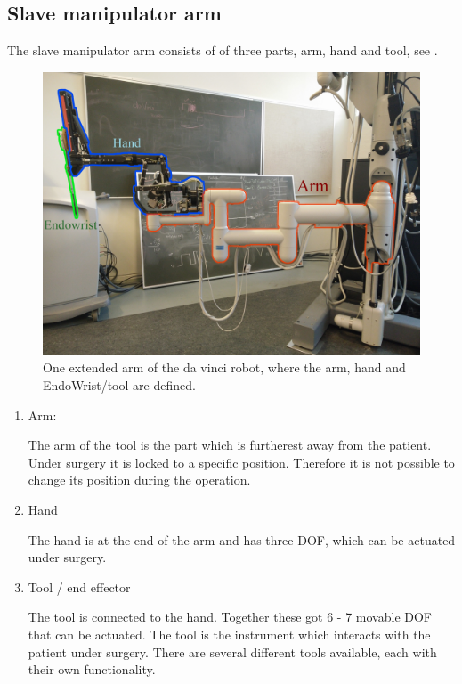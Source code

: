 

\subsection*{Slave manipulator arm}
The slave manipulator arm consists of of three parts, arm, hand and tool, see .

\begin{figure}[H]
	\centering
		\centering
		\includegraphics[width=0.85\linewidth]{davincirobotarm_label.jpg}
		\caption{One extended arm of the da vinci robot, where the arm, hand and EndoWrist/tool are defined.}
		\label{fig:davinciarmrobot}
\end{figure}


\begin{enumerate}
\item Arm:

The arm of the tool is the part which is furtherest away from the patient. 
Under surgery it is locked to a specific position. Therefore it is not possible to change its position during the operation.
\item Hand

The hand is at the end of the arm and has three \gls{DOF}, which can be actuated under surgery.
\item Tool / end effector 

The tool is connected to the hand. Together these got 6 - 7 movable \gls{DOF} that can be actuated. The tool is the instrument which interacts with the patient under surgery. There are several different tools available, each with their own functionality. 
\end{enumerate}

